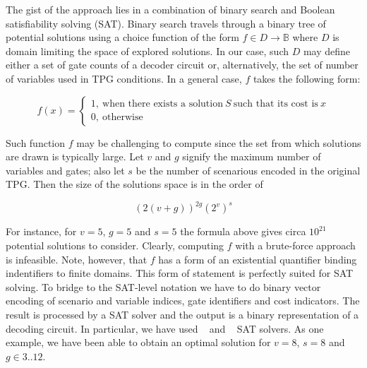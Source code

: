 The gist of the approach lies in a combination of binary search and Boolean satisfiability solving (SAT). Binary search travels through a binary tree of potential solutions using a choice function of the form $f \in D \rightarrow \mathbb{B}$ where $D$ is domain limiting the space of explored solutions. In our case, such $D$ may define either a set of gate counts of a decoder circuit or, alternatively, the set of number of variables used in TPG conditions. In a general case, $f$ takes the following form: 

$$f(x) = \left \{ \begin{array}{l} 1,~ \text{when there exists a solution} ~ S ~ \text{such that its cost is}~ x \\ 0,~ \text{otherwise}  \end{array} \right .$$   

\noindent
Such function $f$ may be challenging to compute since the set from which solutions are drawn is typically large. Let $v$ and $g$ signify the maximum number of variables and gates; also let $s$ be the number of scenarious encoded in the original TPG. Then the size of the solutions space is in the order of 

$$\left (2 (v + g) \right )^{2g} \left (2^{v} \right )^{s}$$  

\noindent For instance, for $v=5$, $g=5$ and $s=5$ the formula above gives circa $10^{21}$ potential solutions to consider. Clearly, computing $f$ with a brute-force approach is infeasible. Note, however, that $f$ has a form of an existential quantifier binding indentifiers to finite domains. This form of statement is perfectly suited for SAT solving. To bridge to the SAT-level notation we have to do binary vector encoding of scenario and variable indices, gate identifiers and cost indicators. The result is processed by a SAT solver and the output is a binary representation of a decoding circuit. In particular, we have used ~\cite{2004_miniSAT_lncs} and ~\cite{clasp} SAT solvers. As one example, we have been able to obtain an optimal solution for $v=8$, $s=8$ and $g \in 3 .. 12$.     
